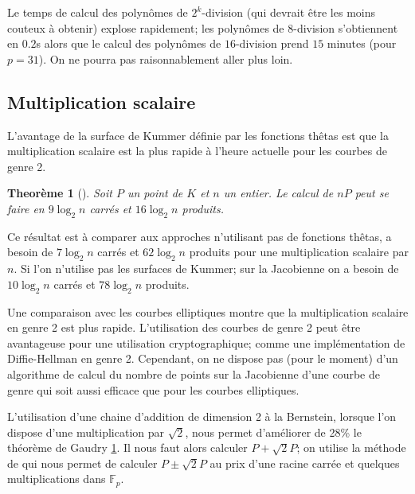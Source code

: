 \documentclass[a4paper]{article}
\newtheorem{theoreme}{Theorème}[section]
\theoremstyle{definition}
\theoremstyle{remark}
\numberwithin{equation}{section}
\begin{document}

Le temps de calcul des polynômes de $2^k$-division (qui devrait être les moins couteux à obtenir) explose rapidement; les polynômes de $8$-division s'obtiennent en $0.2$s alors que le calcul des polynômes de $16$-division prend $15$ minutes (pour $p=31$). On ne pourra pas raisonnablement aller plus loin.

\subsection{Multiplication scalaire}
L'avantage de la surface de Kummer définie par les fonctions thêtas est que la multiplication scalaire est la plus rapide à l'heure actuelle pour les courbes de genre 2.
\begin{theoreme}[\citet{gaudry}]
\label{mulscal}
Soit $P$ un point de $K$ et $n$ un entier. Le calcul de $nP$ peut se faire en $9\log_2 n$ carrés et $16\log_2 n$ produits.
\end{theoreme}

Ce résultat est à comparer aux approches n'utilisant pas de fonctions thêtas, \citet{duquesne} a besoin de $7\log_2 n$ carrés et $62\log_2 n$ produits pour une multiplication scalaire par $n$. Si l'on n'utilise pas les surfaces de Kummer; sur la Jacobienne on a besoin de $10\log_2 n$ carrés et $78\log_2 n$ produits.

Une comparaison avec les courbes elliptiques montre que la multiplication scalaire en genre 2 est plus rapide. L'utilisation des courbes de genre 2 peut être avantageuse pour une utilisation cryptographique; comme une implémentation de Diffie-Hellman en genre 2. Cependant, on ne dispose pas (pour le moment) d'un algorithme de calcul du nombre de points sur la Jacobienne d'une courbe de genre qui soit aussi efficace que pour les courbes elliptiques.

L'utilisation d'une chaine d'addition de dimension 2 à la Bernstein, lorsque l'on dispose d'une multiplication par $\sqrt{2}$, nous permet d'améliorer de 28\% le théorème de Gaudry \ref{mulscal}. Il nous faut alors calculer $P+\sqrt{2}P$; on utilise la méthode de \citet[p.100]{robert} qui nous permet de calculer $P\pm\sqrt{2}P$ au prix d'une racine carrée et quelques multiplications dans $\mathbb{F}_p$.




\end{document}
